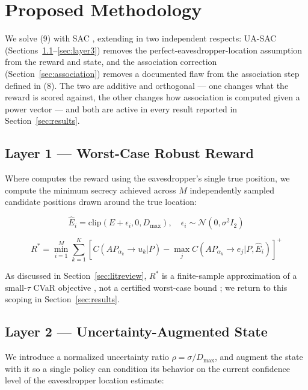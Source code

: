 \documentclass[conference]{IEEEtran}
\begin{document}
\section{Proposed Methodology}
\label{sec:methodology}

We solve (9) with SAC \cite{sac1,sac2}, extending \cite{hoseini} in two independent respects: UA-SAC (Sections~\ref{sec:layer1}--\ref{sec:layer3}) removes the perfect-eavesdropper-location assumption from the reward and state, and the association correction (Section~\ref{sec:association}) removes a documented flaw from the association step defined in (8). The two are additive and orthogonal --- one changes what the reward is scored against, the other changes how association is computed given a power vector --- and both are active in every result reported in Section~\ref{sec:results}.

\subsection{Layer 1 --- Worst-Case Robust Reward}
\label{sec:layer1}

Where \cite{hoseini} computes the reward using the eavesdropper's single true position, we compute the minimum secrecy achieved across $M$ independently sampled candidate positions drawn around the true location:

\begin{equation}
\hat{E}_i=
\text{clip}(E+\epsilon_i,0,D_{\max}),
\quad
\epsilon_i\sim\mathcal{N}(0,\sigma^2I_2)
\end{equation}

\begin{equation}
R^*=
\min_{i=1}^{M}
\sum_{k=1}^{K}
\left[
C(AP_{\alpha_k}\rightarrow u_k|P)
-
\max_j C(AP_{\alpha_k}\rightarrow e_j|P,\hat{E}_i)
\right]^+
\end{equation}

As discussed in Section~\ref{sec:litreview}, $R^*$ is a finite-sample approximation of a small-$\tau$ CVaR objective \cite{cvar}, not a certified worst-case bound \cite{zhao25}; we return to this scoping in Section~\ref{sec:results}.

\subsection{Layer 2 --- Uncertainty-Augmented State}
\label{sec:layer2}

We introduce a normalized uncertainty ratio $\rho=\sigma/D_{\max}$, and augment the state with it so a single policy can condition its behavior on the current confidence level of the eavesdropper location estimate:
\end{document}
